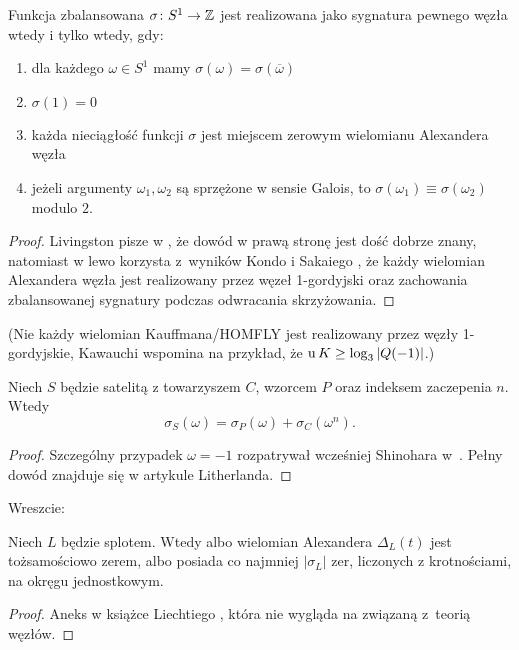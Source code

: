 \begin{proposition}
\label{balanced_iff_four_conditions}%
    Funkcja zbalansowana $\sigma \colon S^1 \to \mathbb Z$ jest realizowana jako sygnatura pewnego węzła wtedy i tylko wtedy, gdy:
    \begin{enumerate}
        \item dla każdego $\omega \in S^1$ mamy $\sigma(\omega) = \sigma(\overline{\omega})$
        \item $\sigma(1) = 0$
        \item każda nieciągłość funkcji $\sigma$ jest miejscem zerowym wielomianu Alexandera węzła
        \item jeżeli argumenty $\omega_1, \omega_2$ są sprzężone w sensie Galois, to $\sigma(\omega_1) \equiv \sigma(\omega_2)$ modulo $2$.
    \end{enumerate}
\end{proposition}

\begin{proof}
    Livingston pisze w \cite{livingston18}, że dowód w prawą stronę jest dość dobrze znany, natomiast w lewo korzysta z~wyników Kondo \cite{kondo79} i Sakaiego \cite{sakai77}, że każdy wielomian Alexandera węzła jest realizowany przez węzeł 1-gordyjski oraz zachowania zbalansowanej sygnatury podczas odwracania skrzyżowania.
\end{proof}

(Nie każdy wielomian Kauffmana/HOMFLY jest realizowany przez węzły 1-gordyjskie, Kawauchi \cite[s. 151]{kawauchi96} wspomina na przykład, że $\operatorname{u} K \ge \log_3 |Q(-1)|$.)

\begin{proposition}
%
    Niech $S$ będzie satelitą z towarzyszem $C$, wzorcem $P$ oraz indeksem zaczepenia $n$.
    Wtedy
    \begin{equation}
        \sigma_S(\omega) = \sigma_P(\omega) + \sigma_C(\omega^n).
    \end{equation}
\end{proposition}

\begin{proof}
    Szczególny przypadek $\omega = -1$ rozpatrywał wcześniej Shinohara w~\cite{shinohara71}.
    Pełny dowód znajduje się w artykule \cite{litherland79} Litherlanda.
\end{proof}

Wreszcie:

\begin{proposition}
    Niech $L$ będzie splotem.
    Wtedy albo wielomian Alexandera $\Delta_L(t)$ jest tożsamościowo zerem, albo posiada co najmniej $|\sigma_L|$ zer, liczonych z krotnościami, na okręgu jednostkowym.
\end{proposition}

\begin{proof}
    Aneks w książce Liechtiego \cite{liechti16}, która nie wygląda na związaną z~teorią węzłów.
\end{proof}



